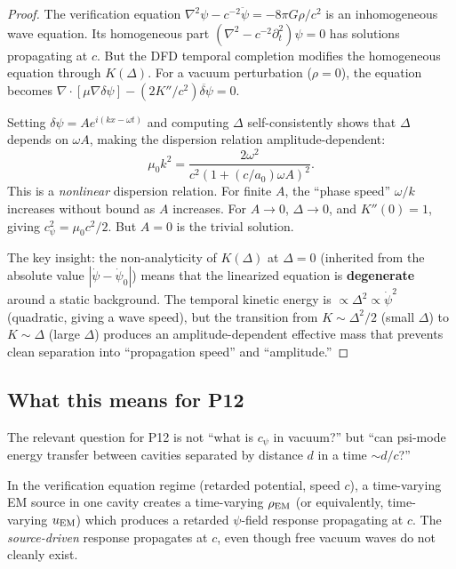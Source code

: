 \documentclass[11pt]{article}
\begin{document}
\begin{proof}
The verification equation $\nabla^2\psi - c^{-2}\ddot\psi = -8\pi G\rho/c^2$
is an inhomogeneous wave equation. Its homogeneous part
$(\nabla^2 - c^{-2}\partial_t^2)\psi = 0$ has solutions propagating
at $c$. But the DFD temporal completion modifies the homogeneous
equation through $K(\Delta)$. For a vacuum perturbation ($\rho = 0$),
the equation becomes $\nabla\cdot[\mu\nabla\delta\psi] -
(2K''/c^2)\ddot{\delta\psi} = 0$.

Setting $\delta\psi = A e^{i(kx - \omega t)}$ and computing $\Delta$
self-consistently shows that $\Delta$ depends on $\omega A$, making
the dispersion relation amplitude-dependent:
\begin{equation}
\mu_0 k^2 = \frac{2\omega^2}{c^2(1 + (c/a_0)\omega A)^2}.
\end{equation}
This is a \emph{nonlinear} dispersion relation. For finite $A$,
the ``phase speed'' $\omega/k$ increases without bound as $A$ increases.
For $A \to 0$, $\Delta \to 0$, and $K''(0) = 1$, giving
$c_\psi^2 = \mu_0 c^2/2$. But $A = 0$ is the trivial solution.

The key insight: the non-analyticity of $K(\Delta)$ at $\Delta = 0$
(inherited from the absolute value $|\dot\psi - \dot\psi_0|$) means
that the linearized equation is \textbf{degenerate} around a static
background. The temporal kinetic energy is $\propto \Delta^2 \propto
\dot\psi^2$ (quadratic, giving a wave speed), but the transition
from $K \sim \Delta^2/2$ (small $\Delta$) to $K \sim \Delta$ (large
$\Delta$) produces an amplitude-dependent effective mass that
prevents clean separation into ``propagation speed'' and ``amplitude.''
\end{proof}

\subsection{What this means for P12}

The relevant question for P12 is not ``what is $c_\psi$ in vacuum?''
but ``can psi-mode energy transfer between cavities separated by
distance $d$ in a time $\sim d/c$?''

In the verification equation regime (retarded potential, speed $c$),
a time-varying EM source in one cavity creates a time-varying
$\rho_{\rm EM}$ (or equivalently, time-varying $u_{\rm EM}$) which
produces a retarded $\psi$-field response propagating at $c$. The
\emph{source-driven} response propagates at $c$, even though free
vacuum waves do not cleanly exist.
\end{document}

